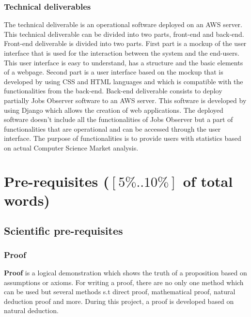 \documentclass[conference,compsoc]{IEEEtran}
\begin{document}
\subsubsection{Technical deliverables}
The technical deliverable is an operational software deployed on an AWS server. This technical deliverable can be divided into two parts, front-end and back-end. 
Front-end deliverable is divided into two parts. First part is a mockup of the user interface that is used for the interaction between the system and the end-users. This user interface is easy to understand, has a structure and the basic elements of a webpage.                                                               Second part is a user interface based on the mockup that is developed by using CSS and HTML languages and which is compatible with the functionalities from the back-end. 
Back-end deliverable consists to deploy partially Jobs Observer software to an AWS server. This software is developed by using Django which allows the creation of web applications. The deployed software doesn’t include all the functionalities of Jobs Observer but a part of functionalities that are operational and can be accessed through the user interface. The purpose of functionalities is to provide users with statistics based on actual Computer Science Market analysis. 




\section{Pre-requisites ($[5\%..10\%]$ of total words)} 

\subsection{Scientific pre-requisites}
\subsubsection{Proof}
\textbf{Proof} is a logical demonstration which shows the truth of a proposition based on assumptions or axioms. For writing a proof, there are no only one method which can be used but several methods s.t direct proof, mathematical proof, natural deduction proof and more. During this project, a proof is developed based on natural deduction. 
\end{document}

